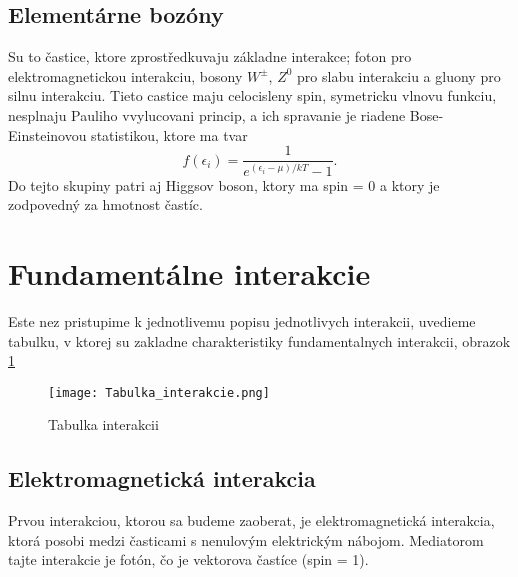 \documentclass[../../main.tex]{subfiles}
\begin{document}
\subsection{Elementárne bozóny}
Su to častice, ktore zprostředkuvaju základne interakce; foton pro elektromagnetickou interakciu, bosony $W^{\pm}$, $Z^0$ pro slabu interakciu a gluony pro silnu interakciu.
Tieto castice maju celocisleny spin, symetricku vlnovu funkciu, nesplnaju Pauliho vvylucovani princip, a ich spravanie je riadene Bose-Einsteinovou statistikou, ktore ma tvar
\begin{equation}
f(\epsilon_i)=\frac{1}{e^{(\epsilon_i-\mu)/kT}-1}.
\end{equation}
Do tejto skupiny patri aj Higgsov boson, ktory ma spin = 0 a ktory je zodpovedný za hmotnost častíc.

\section{Fundamentálne interakcie}
Este nez pristupime k jednotlivemu popisu jednotlivych interakcii, uvedieme tabulku, v ktorej su zakladne charakteristiky fundamentalnych interakcii, obrazok \ref{sf1:fig:Tabulka_interakcie}
\begin{figure}[!h]
\texttt{[image: Tabulka\_interakcie.png]}
\caption{Tabulka interakcii}
\label{sf1:fig:Tabulka_interakcie}
\end{figure}
\subsection{Elektromagnetická interakcia}
Prvou interakciou, ktorou sa budeme zaoberat, je elektromagnetická interakcia, ktorá posobi medzi časticami s nenulovým elektrickým nábojom. Mediatorom tajte interakcie je fotón, čo je vektorova častíce (spin = 1).
\end{document}
